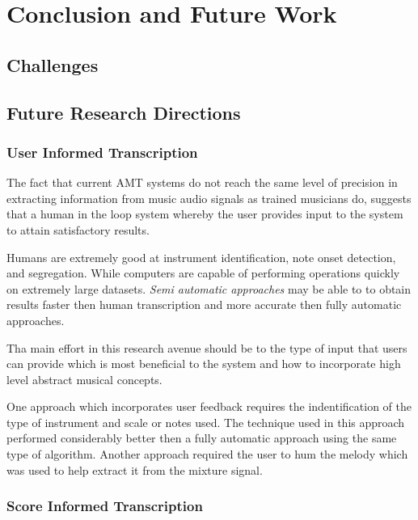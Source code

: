 \chapter{Conclusion and Future Work}
\label{ch:concl}

\section{Challenges}
\label{section:challenges}

\cite{roadmap-MIR:Serra2013}

\section{Future Research Directions}

\subsection{User Informed Transcription}

The fact that current AMT systems do not reach the same level of precision in
extracting information from music audio signals as trained musicians do,
suggests that a human in the loop system whereby the user provides input to the
system to attain satisfactory results.

Humans are extremely good at instrument identification, note onset detection,
and segregation. While computers are capable of performing operations quickly on
extremely large datasets. \cite{ISMIR-tut:Benetos} \emph{Semi automatic
    approaches} may be able to to obtain results faster then human transcription and
more accurate then fully automatic approaches. \cite{ISMIR-tut:Benetos}

Tha main effort in this research avenue should be to the type of input that
users can provide which is most beneficial to the system and how to incorporate
high level abstract musical concepts.

One approach which incorporates user feedback requires the indentification of
the type of instrument and scale or notes used. \cite{user-inform:Kirchoff2012}
The technique used in this approach performed considerably better then a fully
automatic approach using the same type of algorithm. Another approach required
the user to hum the melody which was used to help extract it from the mixture
signal. \cite{humming2009:Smaragdis}

\subsection{Score Informed Transcription}

